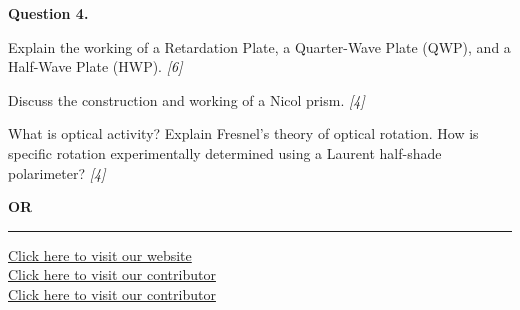 \documentclass[11pt,a4paper]{article}
\newcommand{\pts}[1]{\hfill   \textit{[#1]}}
\begin{document}
\noindent   \textbf{Question 4.}

\begin{parts}
  \item Explain the working of a Retardation Plate, a Quarter-Wave Plate (QWP), and a Half-Wave Plate (HWP). \pts{6}
  \item Discuss the construction and working of a Nicol prism. \pts{4}
  \item What is optical activity? Explain Fresnel's theory of optical rotation. How is specific rotation experimentally determined using a Laurent half-shade polarimeter? \pts{4}
\end{parts}
\hfill   \textbf{OR}


\vfill
\rule{\linewidth}{0.4pt}

\begin{center}\small
  \href{https://bhu-exam.vercel.app/}{Click here to visit our website}\\[4pt]
  \href{https://me-aryan.vercel.app/}{Click here to visit our contributor}\\[4pt]
  \href{https://quashan-me.vercel.app/}{Click here to visit our contributor}
\end{center}
\end{document}
